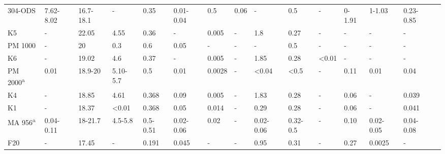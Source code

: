 \begin{sidewaystable}[]
{\begin{tabular}{lllllllllllllll}
304-ODS               & 7.62-8.02   & 16.7-18.1   & -               & 0.35          & 0.01-0.04       & 0.5        & 0.06       & -               & 0.5             & -               & 0-1.91          & 1-1.03      & 0.23-0.85   &\cite{RN2664,RN1098, RN1364,RN248,RN1366,RN259}              \\
K5                    & -           & 22.05       & 4.55            & 0.36          & -               & 0.005      & -          & 1.8             & 0.27            & -               & -               & -           & -           &\cite{RN527,RN926}              \\
PM 1000               & -           & 20          & 0.3             & 0.6           & 0.05            & -          & -          & -               & 0.5             & -               & -               & -           & -           &\cite{RN926}              \\
K6                    & -           & 19.02       & 4.6             & 0.37          & -               & 0.005      & -          & 1.85            & 0.28            & \textless{}0.01 & -               & -           & -           &\cite{RN926}              \\
PM 2000\textsuperscript{a}              & 0.01        & 18.9-20     & 5.10-5.7        & 0.5           & 0.01            & 0.0028     & -          & \textless{}0.04 & \textless{}0.5  & -               & 0.11            & 0.01        & 0.04        &\cite{RN926,RN290,RN602,RN333,RN37,RN945,RN946,RN105}              \\
K4                    & -           & 18.85       & 4.61            & 0.368         & 0.09            & 0.005      & -          & 1.83            & 0.28            & -               & 0.06            & -           & 0.039       &\cite{RN527,RN926,RN1030}              \\
K1                    & -           & 18.37       & \textless{}0.01 & 0.368         & 0.05            & 0.014      & -          & 0.29            & 0.28            & -               & 0.06            & -           & 0.041       &\cite{RN527,RN926,RN1030}              \\
MA 956\textsuperscript{a}               & 0.04-0.11   & 18-21.7     & 4.5-5.8         & 0.5-0.51      & 0.02-0.06       & 0.02       & -          & 0.02-0.06       & 0.32-0.5        & -               & 0.10            & 0.02-0.05   & 0.04-0.08   &\cite{RN105,RN925,RN1209,RN109,RN1341,RN606,RN1177,RN1253,RN3412,RN1400,RN252}              \\
F20                   & -           & 17.45       & -               & 0.191         & 0.045           & -          & -          & 0.95            & 0.31            & -               & 0.27            & 0.0025      & -           &\cite{RN982}              \\

\end{tabular}}
\end{sidewaystable}
